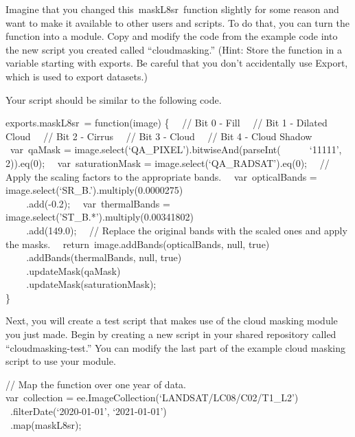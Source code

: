 \documentclass[
  letterpaper,
  DIV=11,
  numbers=noendperiod]{scrreprt}
\begin{document}
Imagine that you changed this~maskL8sr~function slightly for some reason
and want to make it available to other users and scripts. To do that,
you can turn the function into a module. Copy and modify the code from
the example code into the new script you created called
``cloudmasking.'' (Hint: Store the function in a variable starting with
exports. Be careful that you don't accidentally use Export, which is
used to export datasets.)

Your script should be similar to the following code.

exports.maskL8sr~= function(image) \{~ ~// Bit 0 - Fill~ ~// Bit 1 -
Dilated Cloud~ ~// Bit 2 - Cirrus~ ~// Bit 3 - Cloud~ ~// Bit 4 - Cloud
Shadow~ ~var~qaMask = image.select(`QA\_PIXEL').bitwiseAnd(parseInt(~ ~
~ ~`11111', 2)).eq(0);~ ~var~saturationMask =
image.select(`QA\_RADSAT').eq(0);~ ~// Apply the scaling factors to the
appropriate bands.~ ~var~opticalBands =
image.select(`SR\_B.').multiply(0.0000275)\\
\hspace*{0.333em} ~ ~ ~.add(-0.2);~ ~var~thermalBands =
image.select('ST\_B.*').multiply(0.00341802)\\
\hspace*{0.333em} ~ ~ ~.add(149.0);~ ~// Replace the original bands with
the scaled ones and apply the masks.~
~return~image.addBands(opticalBands, null, true)\\
\hspace*{0.333em} ~ ~ ~.addBands(thermalBands, null, true)\\
\hspace*{0.333em} ~ ~ ~.updateMask(qaMask)\\
\hspace*{0.333em} ~ ~ ~.updateMask(saturationMask);\\
\}

Next, you will create a test script that makes use of the cloud masking
module you just made. Begin by creating a new script in your shared
repository called ``cloudmasking-test.'' You can modify the last part of
the example cloud masking script to use your module.

// Map the function over one year of data.\\
var~collection = ee.ImageCollection(`LANDSAT/LC08/C02/T1\_L2')\\
\hspace*{0.333em} ~.filterDate(`2020-01-01', `2021-01-01')\\
\hspace*{0.333em} ~.map(maskL8sr);
\end{document}
